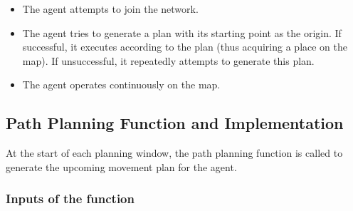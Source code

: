 \begin{itemize}
    \item The agent attempts to join the network.
    \item The agent tries to generate a plan with its starting point as the origin. If successful, it executes according to the plan (thus acquiring a place on the map). If unsuccessful, it repeatedly attempts to generate this plan.
    \item The agent operates continuously on the map.
\end{itemize}



\subsection{Path Planning Function and Implementation}

At the start of each planning window, the path planning function is called to generate the upcoming movement plan for the agent.

\subsubsection{Inputs of the function}

